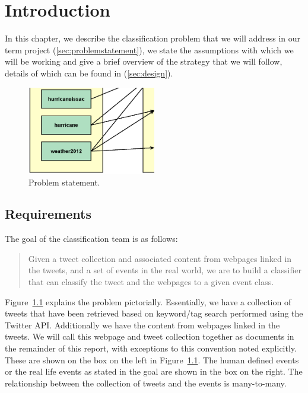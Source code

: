 \chapter{Introduction}

In this chapter, we describe the classification problem that we will address in our term project (\autoref{sec:problemstatement}), we state the assumptions with which we will be working and give a brief overview of the strategy that we will follow, details of which can be found in (\autoref{sec:design}).

\begin{figure}[tbh!]
\centering
 \includegraphics[width=0.5\textwidth]{figs/problem-statement.eps}
 \caption{\small Problem statement. \label{fig:statement}}
\end{figure}

\section{Requirements}
\label{sec:problemstatement}

The goal of the classification team is as follows:
 
\begin{quote}
Given a tweet collection and associated content from webpages linked in the tweets, and a set of events in the real world, we are to build a classifier that can classify the tweet and the webpages to a given event class.
\end{quote}
 
Figure~\ref{fig:statement} explains the problem  pictorially. Essentially, we have a collection of tweets  that have been retrieved based on keyword/tag search performed using the Twitter API. Additionally we have the content from webpages linked in the tweets. We will call this webpage and tweet collection together as documents in the remainder of this report, with exceptions to this convention noted explicitly. These are shown on the box on the left in Figure~\ref{fig:statement}. The human defined events or the real life events as stated in the goal are shown in the box on the right. The relationship between the collection of tweets and the events is many-to-many.

